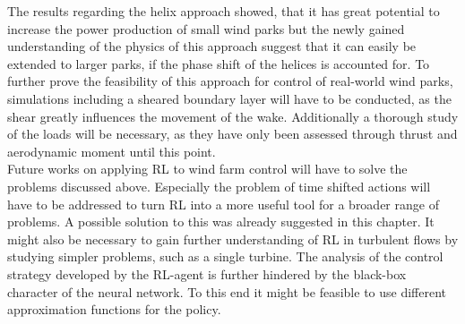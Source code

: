 The results regarding the helix approach showed, that it has great potential to increase the power production of small wind parks but the newly gained understanding of the physics of this approach suggest that it can easily be extended to larger parks, if the phase shift of the helices is accounted for. To further prove the feasibility of this approach for control of real-world wind parks, simulations including a sheared boundary layer will have to be conducted, as the shear greatly influences the movement of the wake. Additionally a thorough study of the loads will be necessary, as they have only been assessed through thrust and aerodynamic moment until this point. \\
Future works on applying RL to wind farm control will have to solve the problems discussed above. Especially the problem of time shifted actions will have to be addressed to turn RL into a more useful tool for a broader range of problems. A possible solution to this was already suggested in this chapter. It might also be necessary to gain further understanding of RL in turbulent flows by studying simpler problems, such as a single turbine. The analysis of the control strategy developed by the RL-agent is further hindered by the black-box character of the neural network. To this end it might be feasible to use different approximation functions for the policy.